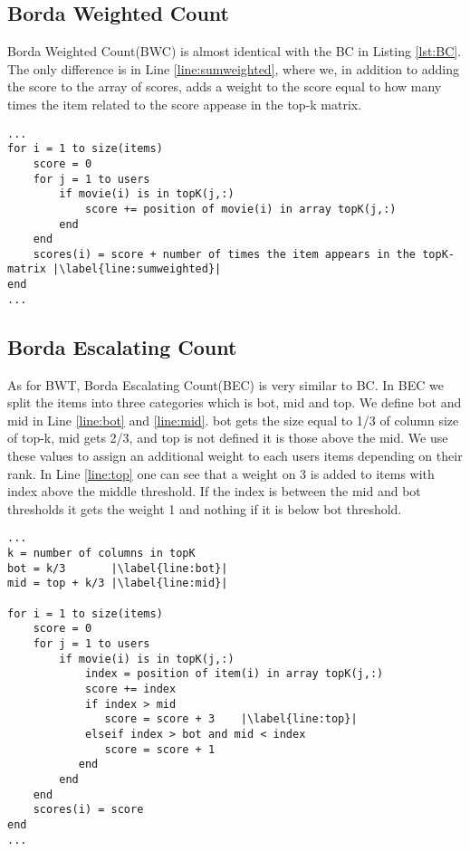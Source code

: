 \subsection{Borda Weighted Count}
Borda Weighted Count(BWC) is almost identical with the BC in Listing \ref{lst:BC}. The only difference is in Line \ref{line:sumweighted}, where we, in addition to adding the score to the array of scores, adds a weight to the score equal to how many times the item related to the score appease in the top-k matrix.

\begin{lstlisting}[caption={Borda weighted count implementation},label=lst:BWC, firstnumber=7,escapechar=|]
...
for i = 1 to size(items)
	score = 0
	for j = 1 to users
		if movie(i) is in topK(j,:)
			score += position of movie(i) in array topK(j,:)
		end
	end
	scores(i) = score + number of times the item appears in the topK-matrix |\label{line:sumweighted}|
end
...
\end{lstlisting}
\subsection{Borda Escalating Count}
As for BWT, Borda Escalating Count(BEC) is very similar to BC. In BEC we split the items into three categories which is bot, mid and top. We define bot and mid in Line \ref{line:bot} and \ref{line:mid}. bot gets the size equal to 1/3 of column size of top-k, mid gets 2/3, and top is not defined it is those above the mid. We use these values to assign an additional weight to each users items depending on their rank. In Line \ref{line:top} one can see that a weight on 3 is added to items with index above the middle threshold. If the index is between the mid and bot thresholds it gets the weight 1 and nothing if it is below bot threshold.
\begin{lstlisting}[caption={Borda escalating count implementation},label=lst:BEC, firstnumber=7,escapechar=|]
...
k = number of columns in topK
bot = k/3 		|\label{line:bot}|
mid = top + k/3	|\label{line:mid}|

for i = 1 to size(items)
	score = 0
	for j = 1 to users
		if movie(i) is in topK(j,:)
			index = position of item(i) in array topK(j,:)
			score += index
			if index > mid			
               score = score + 3	|\label{line:top}|
           	elseif index > bot and mid < index
               score = score + 1
           end 
		end
	end
	scores(i) = score
end
...
\end{lstlisting}

